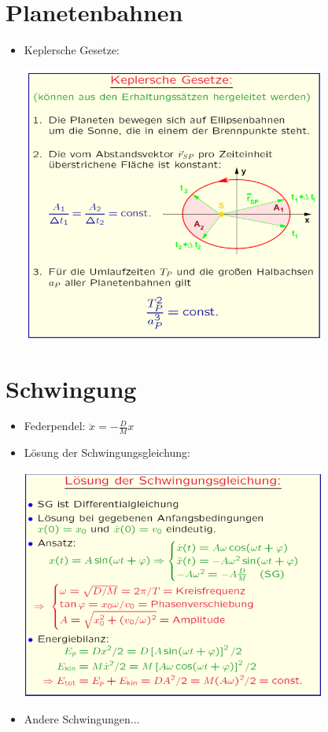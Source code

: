 \documentclass[a4paper,10pt, fleqn]{article}
\begin{document}
\section{Planetenbahnen}
\label{sec:planetenbahnen}

\begin{itemize}
\item Keplersche Gesetze:

  \includegraphics[width=10cm]{KeplerscheGesetze}
\end{itemize}

\section{Schwingung}
\label{sec:schwingung}

\begin{itemize}
\item Federpendel: $\ddot{x} = -\frac{D}{M}x$
\item Lösung der Schwingungsgleichung:

\includegraphics[width=10cm]{Schwingungsgleichung}
\item Andere Schwingungen...
\end{itemize}
\end{document}
